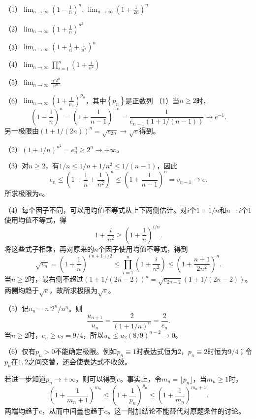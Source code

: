     （1）\(\lim_{n \to \infty} {\left( 1 - \frac{1}{n} \right)}^{n}\),
    \(\lim_{n \to \infty} {\left( 1 + \frac{1}{2 n} \right)}^{n}\)

    （2）\(\lim_{n \to \infty} {\left( 1 + \frac{1}{n} \right)}^{n^{2}}\)

    （3）\(\lim_{n \to \infty} {\left( 1 + \frac{1}{n} + \frac{1}{n^{2}}
        \right)}^{n}\)

    （4）\(\lim_{n \to \infty} \prod _{i = 1}^{n} \left( 1 +
    \frac{i}{n^{2}} \right)\)

    （5）\(\lim_{n \to \infty} \frac{n ! 2^{n}}{n^{n}}\)

    （6）\(\lim_{n \to \infty} {\left( 1 +
        \frac{1}{p_{n}}\right)}^{p_{n}}\)，其中\(\left\{ p_{n} \right\}\)是正数列
\solutionanswer
（1）当\(n\ge2\)时，
\[
\left(1-\frac1n\right)^n=\left(1+\frac1{n-1}\right)^{-n}
=\frac1{e_{n-1}(1+1/(n-1))}\to e^{-1}.
\]
另一极限由\((1+1/(2n))^n=\sqrt{e_{2n}}\to\sqrt e\)得到。

（2）\((1+1/n)^{n^2}=e_n^n\ge2^n\to+\infty\)。

（3）对\(n\ge2\)，有\(1/n\le1/n+1/n^2\le1/(n-1)\)，因此
\[
e_n\le\left(1+\frac1n+\frac1{n^2}\right)^n
\le\left(1+\frac1{n-1}\right)^n=v_{n-1}\to e.
\]
所求极限为\(e\)。

（4）每个因子不同，可以用均值不等式从上下两侧估计。对\(i\)个\(1+1/n\)和\(n-i\)个\(1\)使用均值不等式，得
\[
1+\frac i{n^2}\ge\left(1+\frac1n\right)^{i/n}.
\]
将这些式子相乘，再对原来的\(n\)个因子使用均值不等式，得到
\[
\sqrt{v_n}=\left(1+\frac1n\right)^{(n+1)/2}
\le\prod_{i=1}^n\left(1+\frac i{n^2}\right)
\le\left(1+\frac{n+1}{2n^2}\right)^n.
\]
当\(n\ge2\)时，最右侧不超过\((1+1/(2n-2))^n=\sqrt{e_{2n-2}}(1+1/(2n-2))\)。两侧均趋于\(\sqrt e\)，故所求极限为\(\sqrt e\)。

（5）记\(u_n=n!2^n/n^n\)。则
\[
\frac{u_{n+1}}{u_n}=\frac2{(1+1/n)^n}=\frac2{e_n}.
\]
当\(n\ge2\)时，\(e_n\ge e_2=9/4\)，所以\(u_n\le u_2(8/9)^{n-2}\to0\)。

（6）仅有\(p_n>0\)不能确定极限。例如\(p_n\equiv1\)时表达式恒为\(2\)，\(p_n\equiv2\)时恒为\(9/4\)；令\(p_n\)在\(1,2\)之间交替，还会使表达式不收敛。

若进一步知道\(p_n\to+\infty\)，则可以得到\(e\)。事实上，令\(m_n=\lfloor p_n\rfloor\)，当\(m_n\ge1\)时，
\[
\left(1+\frac1{m_n+1}\right)^{m_n}
\le\left(1+\frac1{p_n}\right)^{p_n}
\le\left(1+\frac1{m_n}\right)^{m_n+1}.
\]
两端均趋于\(e\)，从而中间量也趋于\(e\)。这一附加结论不能替代对原题条件的讨论。
\par
